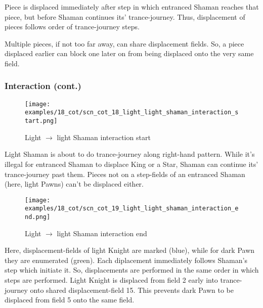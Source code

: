 Piece is displaced immediately after step in which entranced Shaman reaches that piece,
but before Shaman continues its' trance-journey. Thus, displacement of pieces follows
order of trance-journey steps.

Multiple pieces, if not too far away, can share displacement fields. So, a piece
displaced earlier can block one later on from being displaced onto the very same
field.

\clearpage %

\subsubsection*{Interaction (cont.)}

\noindent
\begin{figure}[!h]
\texttt{[image: examples/18\_cot/scn\_cot\_18\_light\_light\_shaman\_interaction\_start.png]}
\caption{Light $\rightarrow$ light Shaman interaction start}
\label{fig:scn_cot_18_light_light_shaman_interaction_start}
\end{figure}

Light Shaman is about to do trance-journey along right-hand pattern. While it's illegal
for entranced Shaman to displace King or a Star, Shaman can continue its' trance-journey
past them. Pieces not on a step-fields of an entranced Shaman (here, light Pawns) can't
be displaced either.

\clearpage %

\noindent
\begin{figure}[!h]
\texttt{[image: examples/18\_cot/scn\_cot\_19\_light\_light\_shaman\_interaction\_end.png]}
\caption{Light $\rightarrow$ light Shaman interaction end}
\label{fig:scn_cot_19_light_light_shaman_interaction_end}
\end{figure}

Here, displacement-fields of light Knight are marked (blue), while for dark Pawn they
are enumerated (green). Each diplacement immediately follows Shaman's step which initiate
it. So, displacements are performed in the same order in which steps are performed. Light
Knight is displaced from field 2 early into trance-journey onto shared displacement-field
15. This prevents dark Pawn to be displaced from field 5 onto the same field.

